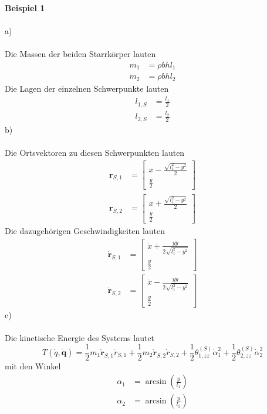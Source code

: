\textbf{Beispiel 1}\\ \\
a)\\ \\
Die Massen der beiden Starrkörper lauten
\begin{align*}
	m_1 &= \rho bhl_1 \\
	m_2 &= \rho bhl_2
\end{align*}
Die Lagen der einzelnen Schwerpunkte lauten
\begin{align*}
	l_{1,S} &= \frac{l_1}{2} \\
	l_{2,S} &= \frac{l_2}{2}
\end{align*}
b)\\ \\
Die Ortsvektoren zu diesen Schwerpunkten lauten
\begin{align*}
	\textbf{r}_{S,1} &= \begin{bmatrix}
		x - \frac{\sqrt{l_1^2 - y^2}}{2} \\
		\frac{y}{2}
	\end{bmatrix}
	\\
	\textbf{r}_{S,2} &= \begin{bmatrix}
	x + \frac{\sqrt{l_1^2 - y^2}}{2} \\
	\frac{y}{2}
	\end{bmatrix}
\end{align*}
Die dazugehörigen Geschwindigkeiten lauten
\begin{align*}
	\dot{\textbf{r}}_{S,1} &= \begin{bmatrix}
		\dot{x} + \frac{y\dot{y}}{2\sqrt{l_1^2 - y^2}} \\
		\frac{\dot{y}}{2}
	\end{bmatrix}
	\\
	\dot{\textbf{r}}_{S,2} &= \begin{bmatrix}
		\dot{x} - \frac{y\dot{y}}{2\sqrt{l_1^2 - y^2}} \\
		\frac{\dot{y}}{2}
	\end{bmatrix}
\end{align*}
c) \\ \\
Die kinetische Energie des Systems lautet
\[
	T(\dot{q},\dot{\textbf{q}}) = \frac{1}{2}m_1\dot{\textbf{r}}_{S,1}\dot{r}_{S,1} + \frac{1}{2}m_2\dot{\textbf{r}}_{S,2}\dot{r}_{S,2} +\frac{1}{2}\theta_{1,zz}^{(S)}\dot{\alpha}_1^2 + \frac{1}{2}\theta_{2,zz}^{(S)}\dot{\alpha}_2^2
\]
mit den Winkel
\begin{align*}
	\alpha_1 &= \arcsin\left(\frac{y}{l_1}\right) \\
	\alpha_2 &= \arcsin\left(\frac{y}{l_2}\right)
\end{align*}
